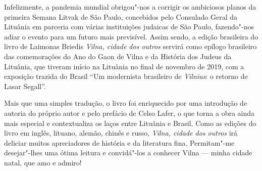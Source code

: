 Infelizmente, a pandemia mundial obrigou"-nos a corrigir os ambiciosos
planos da primeira Semana Litvak de São Paulo, concebidos pelo Consulado
Geral da Lituânia em parceria com várias instituições judaicas de São
Paulo, fazendo"-nos adiar o evento para um futuro mais previsível. Assim
sendo, a edição brasileira do livro de Laimonas Briedis \textit{Vilna, cidade
dos outros} servirá como epílogo brasileiro das comemorações do
Ano do Gaon de Vilna e da História dos Judeus da Lituânia, que
tiveram início na Lituânia no final de novembro de 2019, com a exposição
trazida do Brasil ``Um modernista brasileiro de \textit{Vilnius}: o retorno de
Lasar Segall''.

Mais que uma simples tradução, o livro foi enriquecido por uma
introdução de autoria do próprio autor e pelo prefácio de Celso Lafer, o
que torna a obra ainda mais especial e contextualiza os laços entre
Lituânia e Brasil. Como as edições do livro em inglês, lituano, alemão,
chinês e russo, \textit{Vilna, cidade dos outros} irá deliciar muitos
apreciadores de história e da literatura fina. Permitam"-me desejar"-lhes
uma ótima leitura e convidá"-los a conhecer Vilna --- minha cidade natal,
que amo e admiro!

